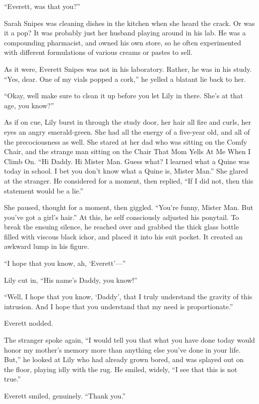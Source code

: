 “Everett, was that you?”

Sarah Snipes was cleaning dishes in the kitchen when she heard the crack. Or was it a pop? It was probably just her husband playing around in his lab. He was a compounding pharmacist, and owned his own store, so he often experimented with different formulations of various creams or pastes to sell.

As it were, Everett Snipes was not in his laboratory. Rather, he was in his study. “Yes, dear. One of my vials popped a cork,” he yelled a blatant lie back to her.

“Okay, well make sure to clean it up before you let Lily in there. She’s at that age, you know?”

As if on cue, Lily burst in through the study door, her hair all fire and curls, her eyes an angry emerald-green. She had all the energy of a five-year old, and all of the precociousness as well. She stared at her dad who was sitting on the Comfy Chair, and the strange man sitting on the Chair That Mom Yells At Me When I Climb On. “Hi Daddy. Hi Mister Man. Guess what? I learned what a Quine was today in school. I bet you don’t know what a Quine is, Mister Man.”
\SmallVSpace
She glared at the stranger. He considered for a moment, then replied, “If I did not, then this statement would be a lie.”

She paused, thought for a moment, then giggled. “You’re funny, Mister Man. But you’ve got a girl’s hair.” At this, he self consciously adjusted his ponytail. To break the ensuing silence, he reached over and grabbed the thick glass bottle filled with viscous black ichor, and placed it into his suit pocket. It created an awkward lump in his figure.

“I hope that you know, ah, ‘Everett’\mbox{---}”

Lily cut in, “His name’s Daddy, you know!”

“Well, I hope that you know, ‘Daddy’, that I truly understand the gravity of this intrusion. And I hope that you understand that my need is proportionate.”

Everett nodded.

The stranger spoke again, “I would tell you that what you have done today would honor my mother’s memory more than anything else you’ve done in your life. But,” he looked at Lily who had already grown bored, and was splayed out on the floor, playing idly with the rug. He smiled, widely, “I see that this is not true.”

Everett smiled, genuinely. “Thank you.”

